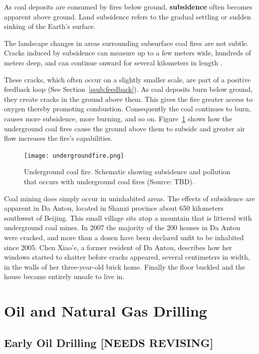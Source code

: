 As coal deposits are consumed by fires below ground, \textbf{subsidence} often becomes apparent above ground. Land subsidence refers to the gradual settling or sudden sinking of the Earth's surface. 

The landscape changes in areas surrounding subsurface coal fires are not subtle. Cracks induced by subsidence can measure up to a few meters wide, hundreds of meters deep, and can continue onward for several kilometers in length \citep{stracher2007coal}. %

These cracks, which often occur on a slightly smaller scale, are part of a positive feedback loop (See Section~\ref{ssub:feedback}). %
As coal deposits burn below ground, they create cracks in the ground above them. This gives the fire greater access to oxygen thereby promoting combustion. Consequently the coal continues to burn, causes more subsidence, more burning, and so on. Figure~\ref{fig:undergroundfire} shows how the underground coal fires cause the ground above them to subside and greater air flow increases the fire's capabilities. 


\begin{figure}[ht]
\centering
    \texttt{[image: undergroundfire.png]}
    \caption{Underground coal fire. Schematic showing subsidence and pollution that occurs with underground coal fires (Source: TBD). }
    \label{fig:undergroundfire}
\end{figure}

Coal mining does simply occur in uninhabited areas. The effects of subsidence are apparent in Da Antou, located in Shanxi province about 650 kilometers southwest of Beijing. This small village sits atop a mountain that is littered with underground coal mines. In 2007 the majority of the 200 houses in Da Antou were cracked, and more than a dozen have been declared unfit to be inhabited since 2005. Chen Xiao'e, a former resident of Da Antou, describes how her windows started to shatter before cracks appeared, several centimeters in width, in the walls of her three-year-old brick home. Finally the floor buckled and the house became entirely unsafe to live in. 

\section{Oil and Natural Gas Drilling}

\subsection{Early Oil Drilling [NEEDS REVISING]}

